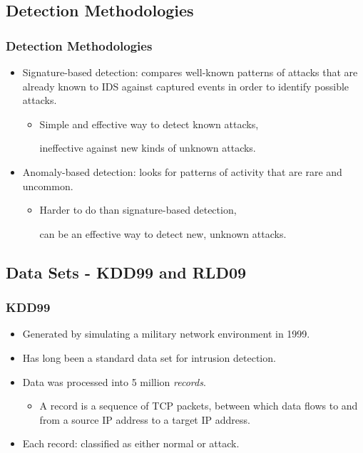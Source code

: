 \documentclass{beamer}
\newcommand{\linespace}{\vskip 0.25cm}
\begin{document}
\subsection{Detection Methodologies}
\begin{frame}
  \frametitle{Detection Methodologies}
  \begin{itemize}
  	\item Signature-based detection: compares well-known patterns of attacks
that are already known to IDS against captured events in order to identify possible attacks.
	\begin{itemize}
		\item Simple and effective way to detect known attacks, 
		
		ineffective against new kinds of unknown attacks.
	\end{itemize}

\linespace
\linespace
\linespace

  	\item Anomaly-based detection: looks for patterns of activity that are rare and uncommon.
	\begin{itemize}
		\item Harder to do than signature-based detection, 
		
		can be an effective way to detect new, unknown attacks.
	\end{itemize}
  \end{itemize}
\end{frame}


\subsection{Data Sets - KDD99 and RLD09}
\begin{frame}
  \frametitle{KDD99}
	\begin{itemize}
		\item Generated by simulating a military network environment in 1999.
		\item Has long been a standard data set for intrusion detection.
		
\linespace		
		
		\item Data was processed into 5 million \emph{records}.
			\begin{itemize}
				\item A record is a sequence of TCP packets, between which data flows to and from a source IP address to a target IP address.
			\end{itemize}
		\item Each record: classified as either normal or attack.
	\end{itemize}
\end{frame}
\end{document}
